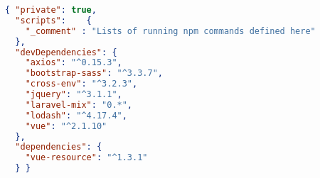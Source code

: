 \begin{lstlisting}[language=json]
{ "private": true,
  "scripts": 	{
	"_comment" : "Lists of running npm commands defined here"
  },
  "devDependencies": {
	"axios": "^0.15.3",
	"bootstrap-sass": "^3.3.7",
	"cross-env": "^3.2.3",
	"jquery": "^3.1.1",
	"laravel-mix": "0.*",
	"lodash": "^4.17.4",
	"vue": "^2.1.10"
  },
  "dependencies": {
	"vue-resource": "^1.3.1"
  } }
\end{lstlisting}